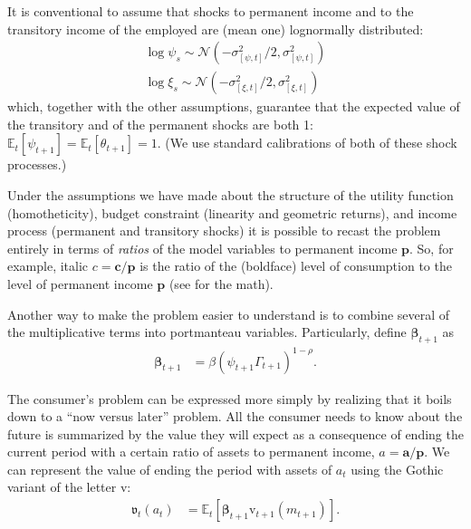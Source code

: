 \documentclass{article}
\newcommand{\CRRA}{\rho}
\newcommand{\cLvl}{\mathbf{c}}
\newcommand{\aLvl}{\mathbf{a}}
\newcommand{\Rport}{\mathcal{R}}
\newcommand{\pLvl}{\mathbf{p}}
\newcommand{\DiscFac}{\beta}
\newcommand{\vFunc}{\mathrm{v}}
\newcommand{\Ex}{\mathbb{E}}
\newcommand{\permGroFac}{\Gamma}
\newcommand{\permShk}{\psi}
\newcommand{\tranShk}{\theta}
\newcommand{\cNrm}{c}
\newcommand{\RNrm}{\mathcal{R}}
\newcommand{\aNrm}{a}
\newcommand{\mNrm}{m}
\begin{document}
It is conventional to assume that shocks to permanent income and to the transitory income of the employed are (mean one) lognormally distributed:
\begin{align}
    \log \permShk_{s} \sim \mathcal{N}(-\sigma_{[\permShk, t]}^{2}/2,\sigma_{[\permShk, t]}^{2})
    \\ \log \xi_{s} \sim \mathcal{N}(-\sigma_{[\xi, t]}^{2}/2,\sigma_{[\xi, t]}^{2})
\end{align}
which, together with the other assumptions, guarantee that the expected value of the transitory and of the permanent shocks are both 1: $\Ex_{t}[\permShk_{t+1}]=\Ex_{t}[\tranShk_{t+1}]=1$.
(We use standard calibrations of both of these shock processes.)

Under the assumptions we have made about the structure of the utility function (homotheticity), budget constraint (linearity and geometric returns), and income process (permanent and transitory shocks) it is possible to recast the problem entirely in terms of \textit{ratios} of the model variables to permanent income $\pLvl$.
So, for example, italic $\cNrm = \cLvl/\pLvl$ is the ratio of the (boldface) level of consumption to the level of permanent income $\pLvl$ (see \cite{BufferStockTheory} for the math).

Another way to make the problem easier to understand is to combine several of the multiplicative terms into portmanteau variables.
Particularly, define $\pmb{\DiscFac}_{t+1}$ as
\begin{align}
     \pmb{\DiscFac}_{t+1} & ={\beta} (\permShk_{t+1} \permGroFac_{t+1})^{1-\CRRA}.
\end{align}

The consumer's problem can be expressed more simply by realizing that it boils down to a ``now versus later'' problem.
All the consumer needs to know about the future is summarized by the value they will expect as a consequence of ending the current period with a certain ratio of assets to permanent income, $\aNrm = \aLvl/\pLvl$.
We can represent the value of ending the period with assets of $\aNrm_t$ using the Gothic variant of the letter $\vFunc$:
\begin{align}
    \mathfrak{v}_{t}(\aNrm_{t}) & = \Ex_{t}[\pmb{\DiscFac}_{t+1}\vFunc_{t+1}(\mNrm_{t+1})].
\end{align}
\end{document}
